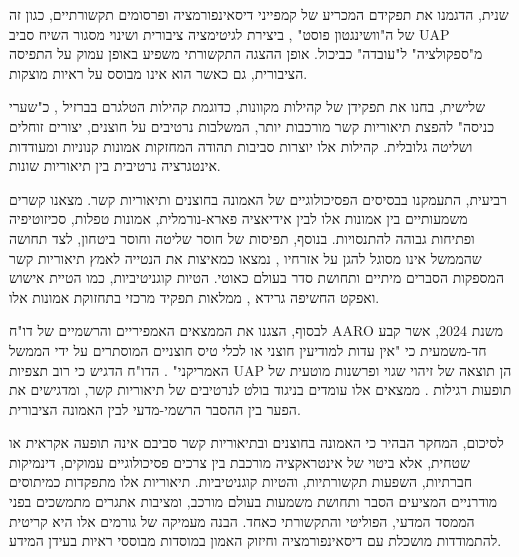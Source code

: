 \documentclass[12pt,a4paper]{article}
\begin{document}
שנית, הדגמנו את תפקידם המכריע של קמפייני דיסאינפורמציה ופרסומים תקשורתיים, כגון זה של ה"וושינגטון פוסט" \cite{AntonVugrin2022}, ביצירת לגיטימציה ציבורית ושינוי מסגור השיח סביב UAP מ"ספקולציה" ל"עובדה" כביכול. אופן ההצגה התקשורתי משפיע באופן עמוק על התפיסה הציבורית, גם כאשר הוא אינו מבוסס על ראיות מוצקות.

שלישית, בחנו את תפקידן של קהילות מקוונות, כדוגמת קהילות הטלגרם בברזיל \cite{Costa2024}, כ"שערי כניסה" להפצת תיאוריות קשר מורכבות יותר, המשלבות נרטיבים על חוצנים, יצורים זוחלים ושליטה גלובלית. קהילות אלו יוצרות סביבות תהודה המחזקות אמונות קנוניות ומעודדות אינטגרציה נרטיבית בין תיאוריות שונות.

רביעית, התעמקנו בבסיסים הפסיכולוגיים של האמונה בחוצנים ותיאוריות קשר. מצאנו קשרים משמעותיים בין אמונות אלו לבין אידיאציה פארא-נורמלית, אמונות טפלות, סכיזוטיפיה \cite{Swami2009} ופתיחות גבוהה להתנסויות. בנוסף, תפיסות של חוסר שליטה \cite{Douglas2015} וחוסר ביטחון, לצד תחושה שהממשל אינו מסוגל להגן על אזרחיו \cite{UnknownAbduction}, נמצאו כמאיצות את הנטייה לאמץ תיאוריות קשר המספקות הסברים מיתיים ותחושת סדר בעולם כאוטי. הטיות קוגניטיביות, כמו הטיית אישוש ואפקט החשיפה גרידא \cite{Wojcik2021Kahneman2011}, ממלאות תפקיד מרכזי בתחזוקת אמונות אלו.

לבסוף, הצגנו את הממצאים האמפיריים והרשמיים של דו"ח AARO משנת 2024, אשר קבע חד-משמעית כי "אין עדות למודיעין חוצני או לכלי טיס חוצניים המוסתרים על ידי הממשל האמריקני" \cite{AARO2024report}. הדו"ח הדגיש כי רוב תצפיות UAP הן תוצאה של זיהוי שגוי ופרשנות מוטעית של תופעות רגילות \cite{AARO2024report}. ממצאים אלו עומדים בניגוד בולט לנרטיבים של תיאוריות קשר, ומדגישים את הפער בין ההסבר הרשמי-מדעי לבין האמונה הציבורית.

לסיכום, המחקר הבהיר כי האמונה בחוצנים ובתיאוריות קשר סביבם אינה תופעה אקראית או שטחית, אלא ביטוי של אינטראקציה מורכבת בין צרכים פסיכולוגיים עמוקים, דינמיקות חברתיות, השפעות תקשורתיות, והטיות קוגניטיביות. תיאוריות אלו מתפקדות כמיתוסים מודרניים המציעים הסבר ותחושת משמעות בעולם מורכב, ומציבות אתגרים מתמשכים בפני הממסד המדעי, הפוליטי והתקשורתי כאחד. הבנה מעמיקה של גורמים אלו היא קריטית להתמודדות מושכלת עם דיסאינפורמציה וחיזוק האמון במוסדות מבוססי ראיות בעידן המידע.

\printbibliography[title={רשימת מקורות}]
\end{document}
